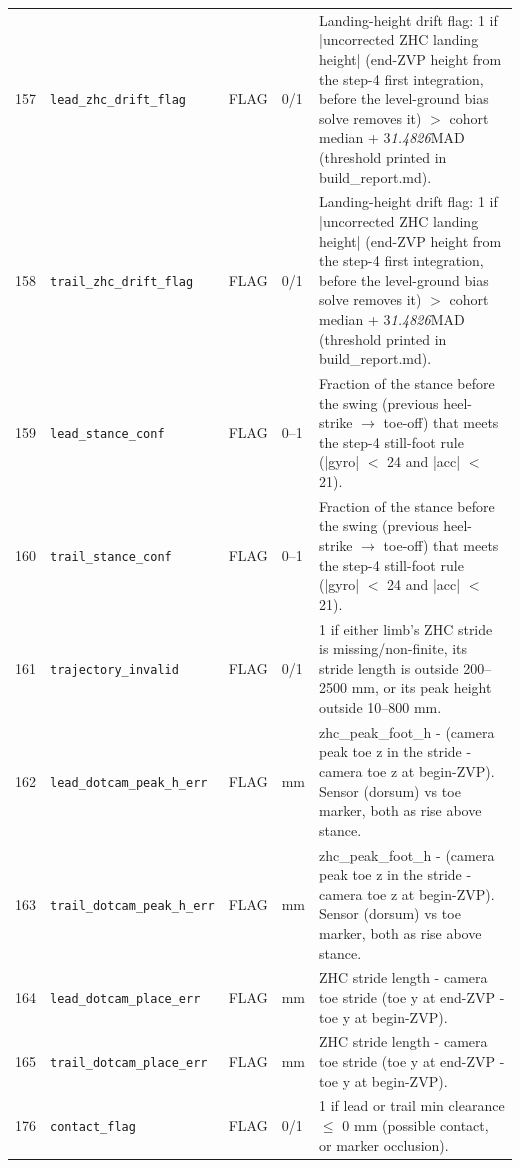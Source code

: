 \begin{longtable}{@{}r p{3.6cm} p{1.55cm} p{1.15cm} p{8.6cm}@{}}
157 & \texttt{lead\_\allowbreak{}zhc\_\allowbreak{}drift\_\allowbreak{}flag} & FLAG & 0/1 & Landing-height drift flag: 1 if |uncorrected ZHC landing height| (end-ZVP height from the step-4 first integration, before the level-ground bias solve removes it) $>$ cohort median + 3\emph{1.4826}MAD (threshold printed in build\_report.md). \\
158 & \texttt{trail\_\allowbreak{}zhc\_\allowbreak{}drift\_\allowbreak{}flag} & FLAG & 0/1 & Landing-height drift flag: 1 if |uncorrected ZHC landing height| (end-ZVP height from the step-4 first integration, before the level-ground bias solve removes it) $>$ cohort median + 3\emph{1.4826}MAD (threshold printed in build\_report.md). \\
159 & \texttt{lead\_\allowbreak{}stance\_\allowbreak{}conf} & FLAG & 0--1 & Fraction of the stance before the swing (previous heel-strike $\rightarrow$ toe-off) that meets the step-4 still-foot rule (|gyro| $<$ 24 and |acc| $<$ 21). \\
160 & \texttt{trail\_\allowbreak{}stance\_\allowbreak{}conf} & FLAG & 0--1 & Fraction of the stance before the swing (previous heel-strike $\rightarrow$ toe-off) that meets the step-4 still-foot rule (|gyro| $<$ 24 and |acc| $<$ 21). \\
161 & \texttt{trajectory\_\allowbreak{}invalid} & FLAG & 0/1 & 1 if either limb's ZHC stride is missing/non-finite, its stride length is outside 200--2500 mm, or its peak height outside 10--800 mm. \\
162 & \texttt{lead\_\allowbreak{}dotcam\_\allowbreak{}peak\_\allowbreak{}h\_\allowbreak{}err} & FLAG & mm & zhc\_peak\_foot\_h - (camera peak toe z in the stride - camera toe z at begin-ZVP). Sensor (dorsum) vs toe marker, both as rise above stance. \\
163 & \texttt{trail\_\allowbreak{}dotcam\_\allowbreak{}peak\_\allowbreak{}h\_\allowbreak{}err} & FLAG & mm & zhc\_peak\_foot\_h - (camera peak toe z in the stride - camera toe z at begin-ZVP). Sensor (dorsum) vs toe marker, both as rise above stance. \\
164 & \texttt{lead\_\allowbreak{}dotcam\_\allowbreak{}place\_\allowbreak{}err} & FLAG & mm & ZHC stride length - camera toe stride (toe y at end-ZVP - toe y at begin-ZVP). \\
165 & \texttt{trail\_\allowbreak{}dotcam\_\allowbreak{}place\_\allowbreak{}err} & FLAG & mm & ZHC stride length - camera toe stride (toe y at end-ZVP - toe y at begin-ZVP). \\
176 & \texttt{contact\_\allowbreak{}flag} & FLAG & 0/1 & 1 if lead or trail min clearance $\leq$ 0 mm (possible contact, or marker occlusion). \\

\end{longtable}
